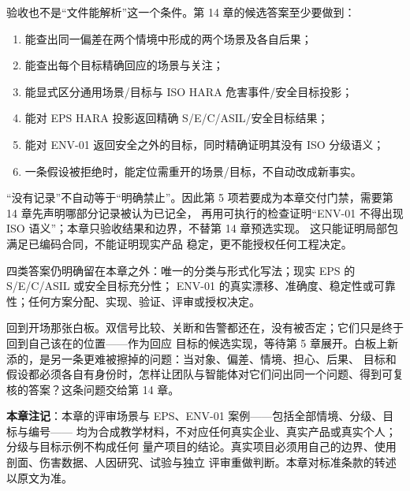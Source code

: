 验收也不是“文件能解析”这一个条件。第 14 章的候选答案至少要做到：

\begin{enumerate}
\item 能查出同一偏差在两个情境中形成的两个场景及各自后果；
\item 能查出每个目标精确回应的场景与关注；
\item 能显式区分通用场景/目标与 ISO HARA 危害事件/安全目标投影；
\item 能对 EPS HARA 投影返回精确 S/E/C/ASIL/安全目标结果；
\item 能对 ENV-01 返回安全之外的目标，同时精确证明其没有 ISO 分级语义；
\item 一条假设被拒绝时，能定位需重开的场景/目标，不自动改成新事实。
\end{enumerate}

“没有记录”不自动等于“明确禁止”。因此第 5 项若要成为本章交付门禁，需要第 14 章先声明哪部分记录被认为已记全，
再用可执行的检查证明“ENV-01 不得出现 ISO 语义”；本章只验收结果和边界，不替第 14 章预选实现。
这只能证明局部包满足已编码合同，不能证明现实产品
稳定，更不能授权任何工程决定。

四类答案仍明确留在本章之外：唯一的分类与形式化写法；现实 EPS 的 S/E/C/ASIL 或安全目标充分性；
ENV-01 的真实漂移、准确度、稳定性或可靠性；任何方案分配、实现、验证、评审或授权决定。

回到开场那张白板。双信号比较、关断和告警都还在，没有被否定；它们只是终于回到自己该在的位置——作为回应
目标的候选实现，等待第 5 章展开。白板上新添的，是另一条更难被擦掉的问题：当对象、偏差、情境、担心、后果、
目标和假设都必须各自有身份时，怎样让团队与智能体对它们问出同一个问题、得到可复核的答案？这条问题交给第 14 章。


\begin{noteblock}
\textbf{本章注记}：本章的评审场景与 EPS、ENV-01 案例——包括全部情境、分级、目标与编号——
均为合成教学材料，不对应任何真实企业、真实产品或真实个人；分级与目标示例不构成任何
量产项目的结论。真实项目必须用自己的边界、使用剖面、伤害数据、人因研究、试验与独立
评审重做判断。本章对标准条款的转述以原文为准。
\end{noteblock}
